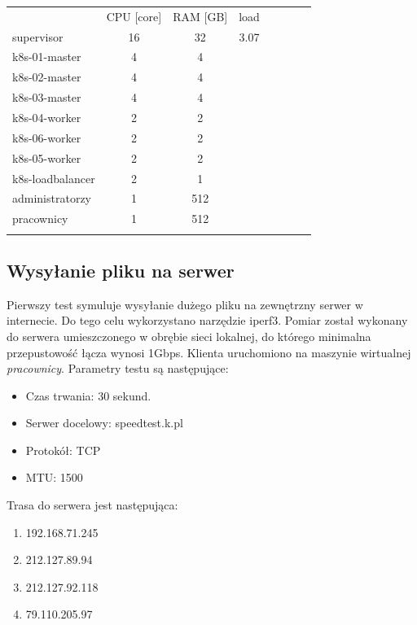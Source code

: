 \documentclass[pl,final,oneside]{mgr} %
\begin{document}
\begin{table}[]
	\begin{tabular}{lccccccc}
		& CPU {[}core{]} & RAM {[}GB{]} & load &  &  &  &  \\
		supervisor       & 16             & 32           & 3.07 &  &  &  &  \\
		k8s-01-master    & 4              & 4            &      &  &  &  &  \\
		k8s-02-master    & 4              & 4            &      &  &  &  &  \\
		k8s-03-master    & 4              & 4            &      &  &  &  &  \\
		k8s-04-worker    & 2              & 2            &      &  &  &  &  \\
		k8s-06-worker    & 2              & 2            &      &  &  &  &  \\
		k8s-05-worker    & 2              & 2            &      &  &  &  &  \\
		k8s-loadbalancer & 2              & 1            &      &  &  &  &  \\
		administratorzy  & 1              & 512          &      &  &  &  &  \\
		pracownicy       & 1              & 512          &      &  &  &  &  \\
		&                &              &      &  &  &  & 
	\end{tabular}
\end{table}

\subsection{Wysyłanie pliku na serwer}
Pierwszy test symuluje wysyłanie dużego pliku na zewnętrzny serwer w internecie. Do tego celu wykorzystano narzędzie iperf3. Pomiar został wykonany do serwera umieszczonego w obrębie sieci lokalnej, do którego minimalna przepustowość łącza wynosi 1Gbps. Klienta uruchomiono na maszynie wirtualnej \textit{pracownicy}. Parametry testu są następujące:
\begin{itemize}
	\item Czas trwania: 30 sekund.
	\item Serwer docelowy: speedtest.k.pl
	\item Protokół: TCP
	\item MTU: 1500
\end{itemize}
Trasa do serwera jest następująca:
\begin{enumerate}                                            
	\item 192.168.71.245
	\item 212.127.89.94
	\item 212.127.92.118 
	\item 79.110.205.97
\end{enumerate}
\end{document}
